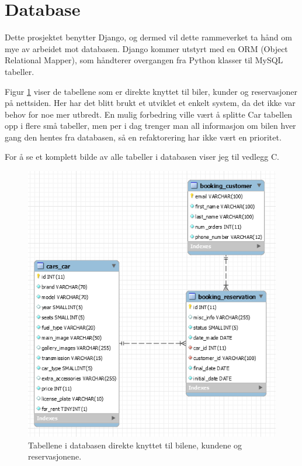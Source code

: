 \newpage


\section{Database}
Dette prosjektet benytter Django, og dermed vil dette rammeverket ta hånd om mye av arbeidet mot databasen. Django kommer utstyrt med en ORM (Object Relational Mapper), som håndterer overgangen fra Python klasser til MySQL tabeller.
 
Figur \ref{fig:tables} viser de tabellene som er direkte knyttet til biler, kunder og reservasjoner på nettsiden. Her har det blitt brukt et utviklet et enkelt system, da det ikke var behov for noe mer utbredt. En mulig forbedring ville vært å splitte Car tabellen opp i flere små tabeller, men per i dag trenger man all informasjon om bilen hver gang den hentes fra databasen, så en refaktorering har ikke vært en prioritet. 

For å se et komplett bilde av alle tabeller i databasen viser jeg til vedlegg C.

 \begin{figure}[htbp]
	\centering
		\includegraphics[scale=0.7]{Bilder/db01.png}
	\caption[Tabellene i Database]{Tabellene i databasen direkte knyttet til bilene, kundene og reservasjonene. } %
	\label{fig:tables}
\end{figure}


